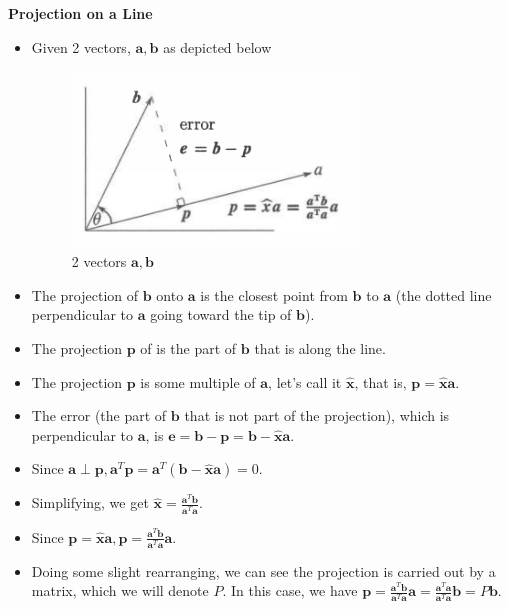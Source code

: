 \documentclass[11pt]{article}
\begin{document}
\textbf{Projection on a Line}
\begin{itemize}
    \item Given 2 vectors, $\boldsymbol{a}, \boldsymbol{b}$ as depicted below
    \begin{figure}[H] 
        \centering 
        \includegraphics[width=3in]{imgs/line_projection.png}
        \caption{2 vectors $\boldsymbol{a}, \boldsymbol{b}$}
    \end{figure}
    \item The projection of $\boldsymbol{b}$ onto $\boldsymbol{a}$ is the closest point from
    $\boldsymbol{b}$ to $\boldsymbol{a}$ (the dotted line perpendicular to 
    $\boldsymbol{a}$ going toward the tip of $\boldsymbol{b}$).
    \item The projection $\boldsymbol{p}$ of is the part of $\boldsymbol{b}$ that is along the 
    line.
    \item The projection $\boldsymbol{p}$ is some multiple of $\boldsymbol{a}$, let's call it 
    $\boldsymbol{\hat{x}}$, that is, $\boldsymbol{p}=\boldsymbol{\hat{x}}\boldsymbol{a}$.
    \item The error (the part of $\boldsymbol{b}$ that is not part of the projection), which is
    perpendicular to $\boldsymbol{a}$, is $\boldsymbol{e} = \boldsymbol{b} - \boldsymbol{p} = 
    \boldsymbol{b} - \boldsymbol{\hat{x}}\boldsymbol{a}$.
    \item Since $\boldsymbol{a} \perp \boldsymbol{p}, \boldsymbol{a}^T \boldsymbol{p} = 
    \boldsymbol{a}^T (\boldsymbol{b} - \boldsymbol{\hat{x}}\boldsymbol{a}) = 0 $.
    \item Simplifying, we get $\boldsymbol{\hat{x}} = \frac{\boldsymbol{a}^T \boldsymbol{b}}{
    \boldsymbol{a}^T\boldsymbol{a}}$.
    \item Since $\boldsymbol{p} = \boldsymbol{\hat{x}}\boldsymbol{a}, \boldsymbol{p} = \frac
    {\boldsymbol{a}^T \boldsymbol{b}}{\boldsymbol{a}^T\boldsymbol{a}} \boldsymbol{a}$.
    \item Doing some slight rearranging, we can see the projection is carried out by a matrix,
    which we will denote $P$. In this case, we have $\boldsymbol{p} = \frac{\boldsymbol{a}^T 
    \boldsymbol{b}}{\boldsymbol{a}^T\boldsymbol{a}} \boldsymbol{a} = \frac{\boldsymbol{a}^T 
    \boldsymbol{a}}{\boldsymbol{a}^T\boldsymbol{a}} \boldsymbol{b} = P\boldsymbol{b}$.
\end{itemize}
\end{document}
